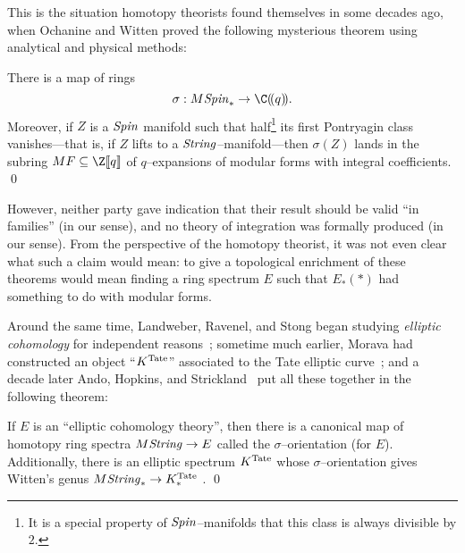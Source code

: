 This is the situation homotopy theorists found themselves in some decades ago, when Ochanine and Witten proved the following mysterious theorem using analytical and physical methods:

\begin{theorem}\label{OchanineWittenTheorem}
There is a map of rings \[\sigma: M\Spin_* \to \C(\!(q)\!).\]  Moreover, if \(Z\) is a \(\mathit{Spin}\) manifold such that half\footnote{It is a special property of \(\mathit{Spin}\)--manifolds that this class is always divisible by \(2\).} its first Pontryagin class vanishes---that is, if \(Z\) lifts to a \(\mathit{String}\)--manifold---then \(\sigma(Z)\) lands in the subring \(MF \subseteq \Z\ps{q}\) of \(q\)--expansions of modular forms with integral coefficients. \qed
\end{theorem}

\noindent However, neither party gave indication that their result should be valid ``in families'' (in our sense), and no theory of integration was formally produced (in our sense).  From the perspective of the homotopy theorist, it was not even clear what such a claim would mean: to give a topological enrichment of these theorems would mean finding a ring spectrum \(E\) such that \(E_*(*)\) had something to do with modular forms.

Around the same time, Landweber, Ravenel, and Stong began studying \textit{elliptic cohomology} for independent reasons~\cite{LRS}; sometime much earlier, Morava had constructed an object ``\(K^{\mathrm{Tate}}\)'' associated to the Tate elliptic curve~\cite[Section 5]{MoravaFormsOfKthy}; and a decade later Ando, Hopkins, and Strickland~\cite{AHSTheoremOfTheCube} put all these together in the following theorem:

\begin{theorem}
If \(E\) is an ``elliptic cohomology theory'', then there is a canonical map of homotopy ring spectra \(M\mathit{String} \to E\) called the \(\sigma\)--orientation (for \(E\)).  Additionally, there is an elliptic spectrum \(K^{\mathrm{Tate}}\) whose \(\sigma\)--orientation gives Witten's genus \(M\mathit{String}_* \to K^{\mathrm{Tate}}_*\) . \qed
\end{theorem}

